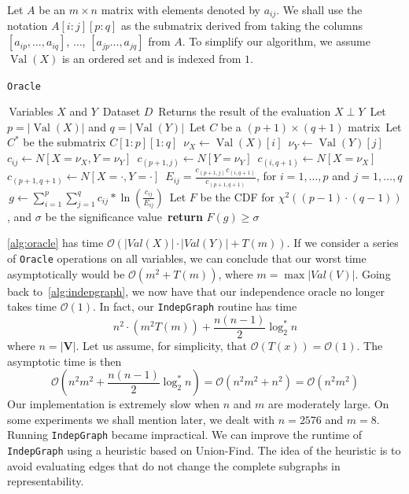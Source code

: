 \documentclass{amsart}
\DeclareMathOperator*{\Val}{\text{Val}}
\theoremstyle{plain}
\numberwithin{equation}{section}
\newcommand{\set}[1]{\mathbf{#1}}
\newcommand{\bigo}{\mathcal{O}}
\newcommand{\code}[1]{\lstinline[mathescape=true]{#1}}
\begin{document}
Let $A$ be an $m\times n$ matrix with elements denoted by $a_{ij}$. We shall use the notation
$A[i:j][p:q]$ as the submatrix derived from taking the columns $[a_{ip},\dots,a_{iq}]$, $\ldots$,
$[a_{jp}\ldots,a_{jq}]$ from $A$. To simplify our algorithm, we assume $\Val(X)$ is an ordered set
and is indexed from $1$.
\begin{algorithm}[H]
  \caption{\code{Oracle}}\label{alg:oracle}
  \begin{algorithmic}[1]
    \Require\,Variables $X$ and $Y$
    \Require\,Dataset $D$
    \Ensure\,Returns the result of the evaluation $X\perp Y$
    \State\,Let $p=|\Val(X)|$ and $q=|\Val(Y)|$
    \State\,Let $C$ be a $(p+1)\times(q+1)$ matrix
    \State\,Let $C^*$ be the submatrix $C[1:p][1:q]$
      \State\,$\nu_X\gets\Val(X)[i]$
        \State\,$\nu_Y\gets\Val(Y)[j]$
        \State\,$c_{ij} \gets N[X=\nu_X,Y=\nu_Y]$
        \State\,$c_{(p+1,j)}\gets N[Y=\nu_Y]$
      \EndFor%
      \State\,$c_{(i,q+1)}\gets N[X=\nu_X]$
    \EndFor%
    \State\,$c_{(p+1,q+1)}\gets N[X=\cdot,Y=\cdot]$
    \State\,$E_{ij} = \frac{c_{(p+1,j)}c_{(i,q+1)}}{c_{(p+1,q+1)}}$, for $i=1,\ldots,p$ and
      $j=1,\ldots,q$
    \State\,$g\gets\sum_{i=1}^p\sum_{j=1}^q c_{ij}*\ln\left(\frac{c_{ij}}{E_{ij}}\right)$
    \State\,Let $F$ be the CDF for $\chi^2((p-1)\cdot(q-1))$, and $\sigma$ be the significance
      value \State\,\textbf{return} $F(g) \geq \sigma$
  \end{algorithmic}
\end{algorithm}

\autoref{alg:oracle} has time $\bigo(|Val(X)|\cdot|Val(Y)| + T(m))$. If we consider a series of
\code{Oracle} operations on all variables, we can conclude that our worst time asymptotically would
be $\bigo(m^2+T(m))$, where $m=\max |Val(V)|$. Going back to~\autoref{alg:indepgraph}, we now have
that our independence oracle no longer takes time $\bigo(1)$. In fact, our \code{IndepGraph}
routine has time
\begin{equation*}
  n^2\cdot(m^2 T(m))+\frac{n(n-1)}{2}\log_2^*n
\end{equation*}
where $n=|\set{V}|$. Let us assume, for simplicity, that $\bigo(T(x))=\bigo(1)$. The asymptotic
time is then
\begin{equation*}
  \bigo(n^2m^2 + \frac{n(n-1)}{2}\log_2^*n) = \bigo(n^2m^2 + n^2) = \bigo(n^2m^2)
\end{equation*}
Our implementation is extremely slow when $n$ and $m$ are moderately large. On some experiments we
shall mention later, we dealt with $n=2576$ and $m=8$. Running \code{IndepGraph} became
impractical. We can improve the runtime of \code{IndepGraph} using a heuristic based on Union-Find.
The idea of the heuristic is to avoid evaluating edges that do not change the complete subgraphs in
representability.
\end{document}
